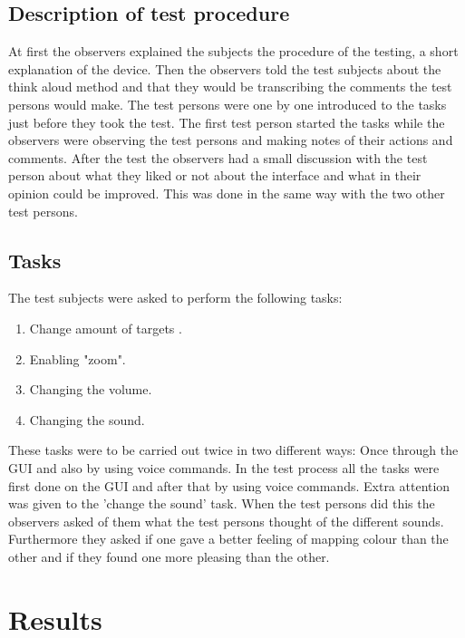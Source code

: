 \documentclass[11pt]{article}
\begin{document}
\subsection{Description of test procedure}
At first the observers explained the subjects the procedure of the testing, a short explanation of the device. Then the observers told the test subjects about the think aloud method and that they would be transcribing the comments the test persons would make. The test persons were one by one introduced to the tasks just before they took the test.  The first test person started the tasks while the observers were observing the test persons and making notes of their actions and comments. After the test the observers had a small discussion with the test person about what they liked or not about the interface and what in their opinion could be improved. This was done in the same way with the two other test persons.
\subsection{Tasks}
The test subjects were asked to perform the following tasks: 
\begin{enumerate}
\item Change amount of targets .
\item Enabling "zoom".
\item Changing the volume.
\item Changing the sound.
\end{enumerate}
These tasks were to be carried out twice in two different ways: Once through the GUI and also by using voice commands. In the test process all the tasks were first done on the GUI and after that by using voice commands. Extra attention was given to the 'change the sound' task. When the test persons did this the observers asked of them what the test persons thought of the different sounds. Furthermore they asked if one gave a better feeling of mapping colour than the other and if they found one more pleasing than the other. 

\section{Results}
\end{document}
